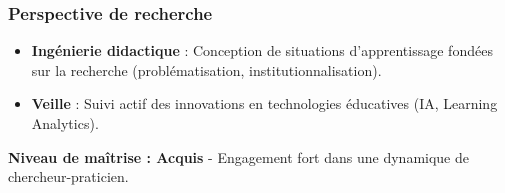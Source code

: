 \subsubsection{Perspective de recherche}
\begin{itemize}[leftmargin=*]
    \item \textbf{Ingénierie didactique} : Conception de situations d'apprentissage fondées sur la recherche (problématisation, institutionnalisation).
    \item \textbf{Veille} : Suivi actif des innovations en technologies éducatives (IA, Learning Analytics).
\end{itemize}

\textbf{Niveau de maîtrise : Acquis} - Engagement fort dans une dynamique de chercheur-praticien.
